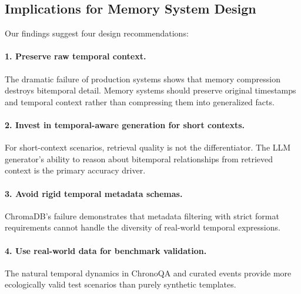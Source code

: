 \subsection{Implications for Memory System Design}
Our findings suggest four design recommendations:

\paragraph{1. Preserve raw temporal context.}
The dramatic failure of production systems shows that memory compression destroys bitemporal detail. Memory systems should preserve original timestamps and temporal context rather than compressing them into generalized facts.

\paragraph{2. Invest in temporal-aware generation for short contexts.}
For short-context scenarios, retrieval quality is not the differentiator. The LLM generator's ability to reason about bitemporal relationships from retrieved context is the primary accuracy driver.

\paragraph{3. Avoid rigid temporal metadata schemas.}
ChromaDB's failure demonstrates that metadata filtering with strict format requirements cannot handle the diversity of real-world temporal expressions.

\paragraph{4. Use real-world data for benchmark validation.}
The natural temporal dynamics in ChronoQA and curated events provide more ecologically valid test scenarios than purely synthetic templates.
